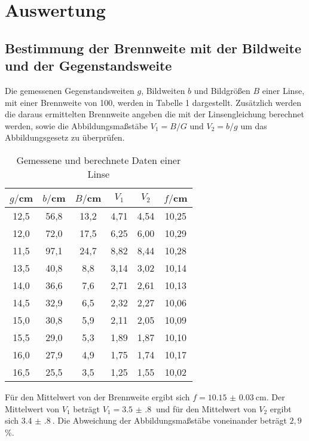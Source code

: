 \section{Auswertung}
\label{sec:Auswertung}

\subsection{Bestimmung der Brennweite mit der Bildweite und der Gegenstandsweite}

Die gemessenen Gegenstandsweiten $g$, Bildweiten $b$ und Bildgrößen $B$ einer Linse, mit einer
Brennweite von 100, werden in Tabelle 1 dargestellt. Zusätzlich werden die daraus ermittelten
Brennweite angeben die mit der Linsengleichung berechnet werden, sowie die Abbildungsmaßstäbe $V_1 = B/G$ und $V_2=b/g$
um das Abbildungsgesetz zu überprüfen.
\begin{table}[H]
  \centering
  \caption{Gemessene und berechnete Daten einer Linse}
  \label{tab:Widerstand}
  \begin{tabular}{c c c c c c}
    \toprule
    $g/$cm  & $b/$cm & $B / $cm & $V_1$ & $V_2$ & $f/$cm \\
    \midrule
    12,5 &    56,8  & 13,2 & 4,71 &   4,54   &  10,25   \\
    12,0 &    72,0  & 17,5 & 6,25 &   6,00   &  10,29   \\
    11,5 &    97,1  & 24,7 & 8,82 &   8,44   &  10,28   \\
    13,5 &    40,8  & 8,8  & 3,14 &   3,02   &  10,14  \\
    14,0 &    36,6  & 7,6  & 2,71 &   2,61   &  10,13  \\
    14,5 &    32,9  & 6,5  & 2,32 &   2,27   &  10,06  \\
    15,0 &    30,8  & 5,9  & 2,11 &   2,05   &  10,09  \\
    15,5 &    29,0  & 5,3  & 1,89 &   1,87   &  10,10  \\
    16,0 &    27,9  & 4,9  & 1,75 &   1,74   &  10,17  \\
    16,5 &    25,5  & 3,5  & 1,25 &   1,55   &  10,02  \\
    \bottomrule
  \end{tabular}
\end{table}



Für den Mittelwert von der Brennweite ergibt sich $f = \SI{10.15(3)}{\centi\meter}$. Der
Mittelwert von $V_1$ beträgt $V_1 = \SI{3.5(8)}{}$ und für den Mittelwert von $V_2$ ergibt sich
$\SI{3.4(8)}{}$.
Die Abweichung der Abbildungsmaßstäbe voneinander beträgt $2,9$\%.

